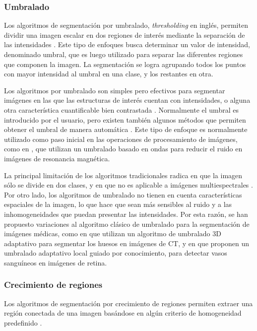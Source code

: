\subsubsection{Umbralado}
Los algoritmos de segmentación por umbralado,  \emph{thresholding} en inglés, permiten dividir una imagen escalar en dos regiones de interés mediante la separación de las intensidades \citep{weszka1978survey}. Este tipo de enfoques busca determinar un valor de intensidad, denominado umbral, que es luego utilizado para separar las diferentes regiones que componen la imagen. La segmentación se logra agrupando todos los puntos con mayor intensidad al umbral en una clase, y los restantes en otra.

Los algoritmos por umbralado son simples pero efectivos para segmentar imágenes en las que las estructuras de interés cuentan con intensidades, o alguna otra característica cuantificable bien contrastada \citep{pham2000current}. Normalmente el umbral es introducido por el usuario, pero existen también algunos métodos que permiten obtener el umbral de manera automática \citep{sahoo1988survey}. Este tipo de enfoque es normalmente utilizado como paso inicial en las operaciones de procesamiento de imágenes, como en \citep{bao2003noise}, que utilizan un umbralado basado en ondas para reducir el ruido en imágenes de resonancia magnética.

La  principal limitación de los algoritmos tradicionales radica en que la imagen sólo se divide en dos clases, y en que no es aplicable a imágenes multiespectrales \citep{pham2000current}. Por otro lado, los algoritmos de umbralado no tienen en cuenta características espaciales de la imagen, lo que hace que sean más sensibles al ruido y a las inhomogeneidades que puedan presentar las intensidades. Por esta razón, se han propuesto variaciones al algoritmo clásico de umbralado para la segmentación de imágenes médicas, como en \citep{zhang2010fast} que utilizan un algoritmo de umbralado 3D adaptativo para segmentar los huesos en imágenes de CT, y en \citep{jiang2003adaptive} que proponen un umbralado adaptativo local guiado por conocimiento, para detectar vasos sanguíneos en imágenes de retina.

\subsubsection{Crecimiento de regiones}
Los algoritmos de segmentación por crecimiento de regiones permiten extraer una región conectada de una imagen basándose en algún criterio de homogeneidad predefinido \citep{haralick1985image}.

